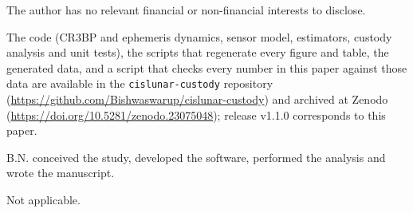 \documentclass[pdflatex,sn-mathphys-num]{sn-jnl}
\begin{document}
The author has no relevant financial or non-financial interests to disclose.

The code (CR3BP and ephemeris dynamics, sensor model, estimators, custody analysis and unit tests),
the scripts that regenerate every figure and table, the generated data, and a script that checks
every number in this paper against those data are available in the \texttt{cislunar-custody}
repository (\url{https://github.com/Bishwaswarup/cislunar-custody}) and archived at Zenodo
(\url{https://doi.org/10.5281/zenodo.23075048}); release v1.1.0 corresponds to this paper.

B.N. conceived the study, developed the software, performed the analysis and wrote the manuscript.

Not applicable.
\end{document}
